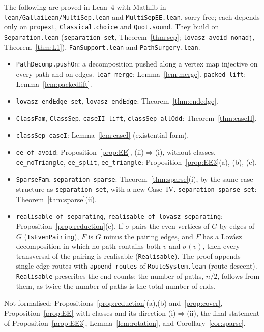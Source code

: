 \documentclass[11pt]{amsart}
\theoremstyle{definition}
\begin{document}
The following are proved in Lean~4 with Mathlib in \texttt{lean/GallaiLean/MultiSep.lean} and
\texttt{MultiSepEE.lean}, sorry-free; each
depends only on \texttt{propext}, \texttt{Classical.choice} and \texttt{Quot.sound}. They build on
\texttt{Separation.lean} (\texttt{separation\_set}, Theorem~\ref{thm:sep}; \texttt{lovasz\_avoid\_nonadj},
Theorem~\ref{thm:L1}), \texttt{FanSupport.lean} and \texttt{PathSurgery.lean}.
\begin{itemize}
\item \texttt{PathDecomp.pushOn}: a decomposition pushed along a vertex map injective on every path and on
edges. \texttt{leaf\_merge}: Lemma~\ref{lem:merge}. \texttt{packed\_lift}: Lemma~\ref{lem:packedlift}.
\item \texttt{lovasz\_endEdge\_set}, \texttt{lovasz\_endEdge}: Theorem~\ref{thm:endedge}.
\item \texttt{ClassFam}, \texttt{ClassSep}, \texttt{caseII\_lift}, \texttt{classSep\_allOdd}:
Theorem~\ref{thm:caseII}.
\item \texttt{classSep\_caseI}: Lemma~\ref{lem:caseI} (existential form).
\item \texttt{ee\_of\_avoid}: Proposition~\ref{prop:EE}, (ii)$\Rightarrow$(i), without classes.
\texttt{ee\_noTriangle}, \texttt{ee\_split}, \texttt{ee\_triangle}: Proposition~\ref{prop:EE3}(a), (b),
(c).
\item \texttt{SparseFam}, \texttt{separation\_sparse}: Theorem~\ref{thm:sparse}(i), by the same case
structure as \texttt{separation\_set}, with a new Case~IV. \texttt{separation\_sparse\_set}:
Theorem~\ref{thm:sparse}(ii).
\item \texttt{realisable\_of\_separating}, \texttt{realisable\_of\_lovasz\_separating}:
Proposition~\ref{prop:reduction}(c). If $\sigma$ pairs the even vertices of $G$ by edges of $G$
(\texttt{IsEvenPairing}), $F$ is $G$ minus the pairing edges, and $F$ has a Lov\'asz decomposition in
which no path contains both $v$ and $\sigma(v)$, then every transversal of the pairing is realisable
(\texttt{Realisable}). The proof appends single-edge routes with \texttt{append\_routes} of
\texttt{RouteSystem.lean} (route-descent). \texttt{Realisable} prescribes the end counts; the number of
paths, $n/2$, follows from them, as twice the number of paths is the total number of ends.
\end{itemize}
Not formalised: Propositions~\ref{prop:reduction}(a),(b) and~\ref{prop:cover}, Proposition~\ref{prop:EE}
with classes and its direction (i)$\Rightarrow$(ii), the final statement of Proposition~\ref{prop:EE3},
Lemma~\ref{lem:rotation}, and Corollary~\ref{cor:sparse}.
\end{document}
